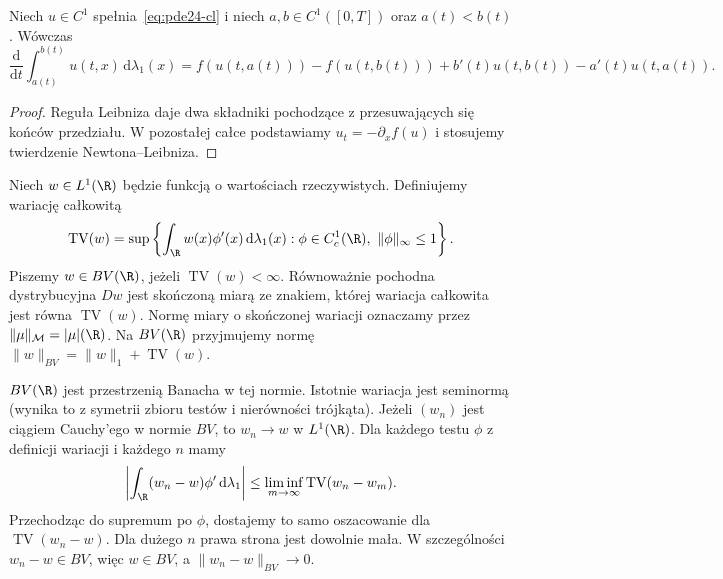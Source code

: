 \begin{stwierdzenie}
\label{prop:pde24-balance}
Niech $u\in C^1$ spełnia~\eqref{eq:pde24-cl} i niech
$a,b\in C^1([0,T])$ oraz $a(t)<b(t)$. Wówczas
\[
 \frac{\mathrm d}{\mathrm dt}\int_{a(t)}^{b(t)}u(t,x)\,\mathrm d\lambda_1(x)
 =f(u(t,a(t)))-f(u(t,b(t)))
 +b'(t)u(t,b(t))-a'(t)u(t,a(t)).
\]
\end{stwierdzenie}
\begin{proof}
Reguła Leibniza daje dwa składniki pochodzące z przesuwających
się końców przedziału. W pozostałej całce podstawiamy
$u_t=-\partial_xf(u)$ i stosujemy twierdzenie Newtona--Leibniza.
\end{proof}

\begin{definicja}
Niech $w\in L^1(\R)$ będzie funkcją o wartościach
rzeczywistych. Definiujemy wariację całkowitą
\[
 \operatorname{TV}(w)=\sup\left\{
 \int_\R w(x)\phi'(x)\,\mathrm d\lambda_1(x):
 \phi\in C_c^1(\R),\ \|\phi\|_\infty\le1\right\}.
\]
Piszemy $w\in BV(\R)$, jeżeli $\operatorname{TV}(w)<\infty$.
Równoważnie pochodna dystrybucyjna $Dw$ jest skończoną
miarą ze znakiem, której wariacja całkowita jest równa
$\operatorname{TV}(w)$.
Normę miary o skończonej wariacji oznaczamy przez
$\|\mu\|_{\mathcal M}=|\mu|(\R)$.
Na $BV(\R)$ przyjmujemy normę
$\|w\|_{BV}=\|w\|_1+\operatorname{TV}(w)$.
\end{definicja}

\begin{uwaga}
$BV(\R)$ jest przestrzenią Banacha w tej normie.
Istotnie wariacja jest seminormą (wynika to z symetrii
zbioru testów i nierówności trójkąta).
Jeżeli $(w_n)$ jest ciągiem Cauchy'ego w normie $BV$,
to $w_n\to w$ w $L^1(\R)$. Dla każdego testu $\phi$
z definicji wariacji i każdego $n$ mamy
\[
 \left|\int_\R(w_n-w)\phi'\,\mathrm d\lambda_1\right|
 \le\liminf_{m\to\infty}\operatorname{TV}(w_n-w_m).
\]
Przechodząc do supremum po $\phi$, dostajemy to samo
oszacowanie dla $\operatorname{TV}(w_n-w)$.
Dla dużego $n$ prawa strona jest dowolnie mała.
W szczególności $w_n-w\in BV$, więc $w\in BV$,
a $\|w_n-w\|_{BV}\to0$.
\end{uwaga}

